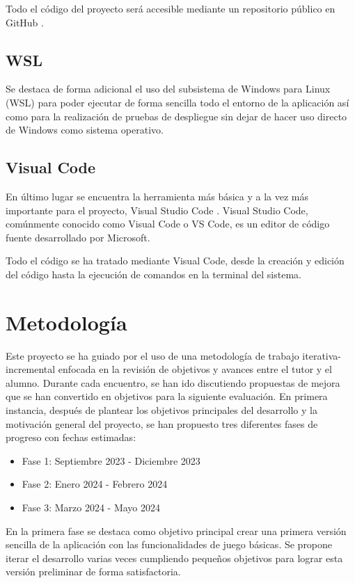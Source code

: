 Todo el código del proyecto será accesible mediante un repositorio público en GitHub \cite{repositorio} .

\subsection{WSL}

Se destaca de forma adicional el uso del subsistema de Windows para Linux (WSL) \cite{wsl} para poder ejecutar de forma sencilla
todo el entorno de la aplicación así como para la realización de pruebas de despliegue sin dejar de hacer uso directo de Windows
como sistema operativo.

\subsection{Visual Code}

En último lugar se encuentra la herramienta más básica y a la vez más importante para
el proyecto, Visual Studio Code \cite{vscode}. Visual Studio Code, comúnmente conocido como Visual Code o VS Code,
es un editor de código fuente desarrollado por Microsoft.

Todo el código se ha tratado mediante Visual Code, desde la creación y edición del código hasta la ejecución de comandos
en la terminal del sistema.


\section{Metodología}

Este proyecto se ha guiado por el uso de una metodología de trabajo iterativa-incremental enfocada en la revisión de objetivos y
avances entre el tutor y el alumno. Durante cada encuentro, se han ido discutiendo propuestas de mejora que se han convertido en
objetivos para la siguiente evaluación. En primera instancia, después de 
plantear los objetivos principales del desarrollo y la motivación general
del proyecto, se han propuesto tres diferentes fases de progreso con fechas estimadas:

\begin{itemize}
	\item Fase 1: Septiembre 2023 - Diciembre 2023
	\item Fase 2: Enero 2024 - Febrero 2024
	\item Fase 3: Marzo 2024 - Mayo 2024
\end{itemize}

En la primera fase se destaca como objetivo principal crear una primera versión sencilla de la aplicación con 
las funcionalidades de juego básicas. Se propone iterar el desarrollo 
varias veces cumpliendo pequeños objetivos para lograr esta versión preliminar de forma satisfactoria.

